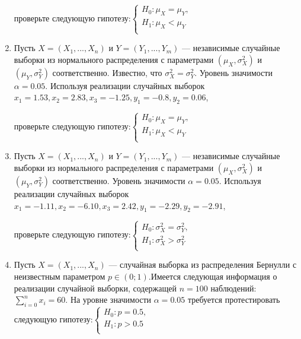 \documentclass[12pt]{article}
\begin{document}
\begin{enumerate}
проверьте следующую гипотезу:$\begin{cases}
H_{0}:\mu_{X} = \mu_{Y}, \\
H_{1}:\mu_{X} < \mu_{Y} \\
\end{cases}$

\item Пусть $X = (X_{1},..., X_{n})$ и $Y = (Y_{1},..., Y_{m})$ — независимые случайные
выборки из нормального распределения с параметрами $(\mu_{X},\sigma^2_{X})$ и $(\mu_{Y},\sigma^2_{Y})$ соответственно. Известно, что $\sigma^2_{X} = \sigma^2_{Y}$. Уровень значимости $\alpha = 0.05$. Используя реализации случайных выборок\newline
\hspace*{3cm}$x_{1} = 1.53, x_{2} = 2.83, x_{3} = -1.25, y_{1} = -0.8, y_{2} = 0.06$,

проверьте следующую гипотезу:$\begin{cases}
H_{0}:\mu_{X} = \mu_{Y}, \\
H_{1}:\mu_{X} < \mu_{Y} \\
\end{cases}$


\item Пусть $X = (X_{1},..., X_{n})$ и $Y = (Y_{1},..., Y_{m})$ — независимые случайные
выборки из нормального распределения с параметрами $(\mu_{X},\sigma^2_{X})$ и $(\mu_{Y},\sigma^2_{Y})$ соответственно. Уровень значимости $\alpha = 0.05$. Используя реализации случайных выборок\newline
\hspace*{3cm}$x_{1} = -1.11, x_{2} = -6.10, x_{3} = 2.42, y_{1} = -2.29, y_{2} = -2.91$,

проверьте следующую гипотезу:$\begin{cases}
H_{0}:\sigma^2_{X} = \sigma^2_{Y}, \\
H_{1}:\sigma^2_{X} > \sigma^2_{Y} \\
\end{cases}$

\item Пусть  $X = (X_{1},..., X_{n})$ — случайная выборка из распределения Бернулли с
неизвестным параметром $p \in (0;1)$.Имеется следующая информация о реализации
случайной выборки, содержащей $n = 100$ наблюдений: $\sum_{i=0}^{n} x_{i} = 60$. На уровне значимости $\alpha = 0.05$ требуется протестировать следующую гипотезу:$\begin{cases}
H_{0}:p = 0.5, \\
H_{1}:p > 0.5 \\
\end{cases}$


\end{enumerate}
\end{document}
